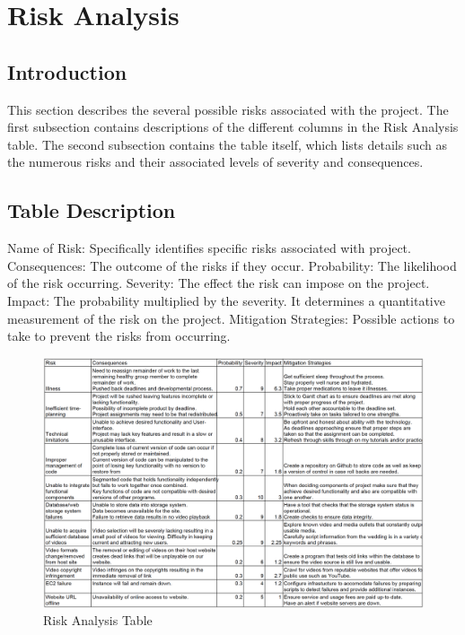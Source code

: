 \chapter{Risk Analysis}

\section{Introduction}
This section describes the several possible risks associated with the project. The first subsection contains descriptions of the different columns in the Risk Analysis table. The second subsection contains the table itself, which lists details such as the numerous risks and their associated levels of severity and consequences. 

\section{Table Description}
Name of Risk: Specifically identifies specific risks associated with project.\newline
Consequences: The outcome of the risks if they occur.\newline
Probability: The likelihood of the risk occurring.\newline
Severity: The effect the risk can impose on the project.\newline
Impact: The probability multiplied by the severity. It determines a quantitative measurement of the risk on the project.\newline
Mitigation Strategies: Possible actions to take to prevent the risks from occurring.\newline

\begin{figure}[!ht]
	\centering
    \includegraphics[width=\textwidth]{riskTable}
    \caption{Risk Analysis Table}
\end{figure}
